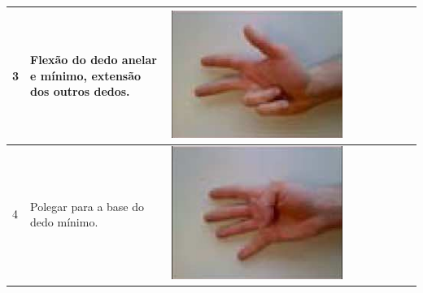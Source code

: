 \begin{table}[htb]
\begin{tabular}{m{0.5cm} m{1.5cm} m{2cm} | m{0.5cm} m{1.5cm} m{2cm} | m{0.5cm} m{1.5cm} m{2cm}}
		3	&	Flexão do dedo anelar e mínimo, extensão dos outros dedos.	& \includegraphics[width=\linewidth]{./img/moves/mov3.png}\\
		\midrule
		4	&	Polegar para a base do dedo mínimo.	& \includegraphics[width=\linewidth]{./img/moves/mov4.png} &

\end{tabular}
\end{table}
